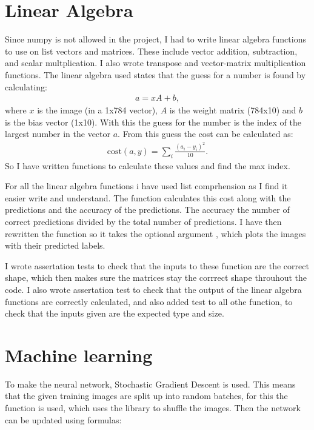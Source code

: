 \documentclass[a4paper,oneside,article]{memoir}
\begin{document}
\section{Linear Algebra}
Since numpy is not allowed in the project, I had to write linear algebra functions to use on list vectors and matrices.
These include vector addition, subtraction, and scalar multplication. 
I also wrote transpose and vector-matrix multiplication functions. 
The linear algebra used states that the guess for a number is found by calculating: 
\begin{align*}
    a = xA+b, 
\end{align*}
where $x$ is the image (in a 1x784 vector), $A$ is the weight matrix (784x10) and $b$ is the bias vector (1x10). 
With this the guess for the number is the index of the largest number in the vector $a$. 
From this guess the cost can be calculated as:
\begin{align*}
    \text{cost}(a, y) = \sum_i\frac{(a_i-y_i)^2}{10}. 
\end{align*}
So I have written functions to calculate these values and find the max index. 

For all the linear algebra functions i have used list comprhension as I find it easier write and understand. 
The  function calculates this cost along with the predictions and the accuracy of the predictions. 
The accuracy the number of correct predictions divided by the total number of predictions.
I have then rewritten the  function so it takes the optional argument , which plots the images with their predicted labels.

I wrote assertation tests to check that the inputs to these function are the correct shape, which then makes sure the matrices stay the corrrect shape throuhout the code.
I also wrote assertation test to check that the output of the linear algebra functions are correctly calculated, and also added test to all othe function, 
to check that the inputs given are the expected type and size. 

\newpage
\section{Machine learning}
To make the neural network, Stochastic Gradient Descent is used. This means that the given training images are split up into random batches, 
for this the  function is used, which uses the  library to shuffle the images. 
Then the network can be updated using formulas: 
\end{document}
